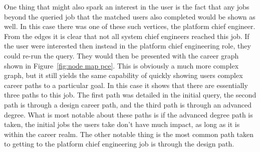 One thing that might also spark an interest in the user is the fact that any
jobs beyond the queried job that the matched users also completed would be shown
as well.  In this case there was one of these such vertices, the platform chief
engineer.  From the edges it is clear that not all system chief
engineers reached this job.  If the user were interested then instead in the
platform chief engineering role, they could re-run the query.  They would then
be presented with the career graph shown in Figure~\ref{fig:node map pce}.  This
is obviously a much more complex graph, but it still yields the same capability
of quickly showing users complex career paths to a particular goal.  In this
case it shows that there are essentially three paths to this job.  The first
path was detailed in the initial query, the second path is through a design
career path, and the third path is through an advanced degree.  What is most
notable about these paths is if the advanced degree path is taken, the initial
jobs the users take don't have much impact, as long as it is within the career realm.
The other notable thing is the most common path taken to getting to the platform
chief engineering job is through the design path.


\usetikzlibrary{shapes,arrows,chains,decorations.markings}

